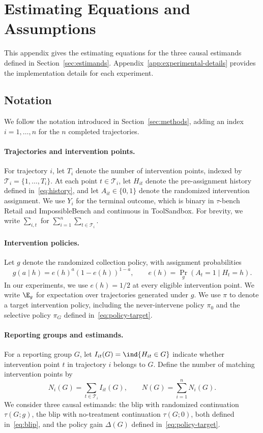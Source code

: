 \section{Estimating Equations and Assumptions}
\label{app:estimating-equations}

This appendix gives the estimating equations for the three causal estimands defined in Section~\ref{sec:estimands}. Appendix~\ref{app:experimental-details} provides the implementation details for each experiment.

\subsection{Notation}

We follow the notation introduced in Section~\ref{sec:methods}, adding an index $i=1,\ldots,n$ for the $n$ completed trajectories.

\paragraph{Trajectories and intervention points.}
For trajectory $i$, let $T_i$ denote the number of intervention points, indexed by $\mathcal T_i=\{1,\ldots,T_i\}$.
At each point $t\in\mathcal T_i$, let $H_{it}$ denote the pre-assignment history defined in~\eqref{eq:history}, and let $A_{it}\in\{0,1\}$ denote the randomized intervention assignment.
We use $Y_i$ for the terminal outcome, which is binary in $\tau$-bench Retail and ImpossibleBench and continuous in ToolSandbox.
For brevity, we write $\sum_{i,t}$ for $\sum_{i=1}^n\sum_{t\in\mathcal T_i}$.

\paragraph{Intervention policies.}
Let $g$ denote the randomized collection policy, with assignment probabilities
\[
g(a\mid h)=e(h)^a(1-e(h))^{1-a},
\qquad
e(h)=\Pr_g(A_t=1\mid H_t=h).
\]
In our experiments, we use $e(h)=1/2$ at every eligible intervention point.
We write $\E_g$ for expectation over trajectories generated under $g$.
We use $\pi$ to denote a target intervention policy, including the never-intervene policy $\pi_0$ and the selective policy $\pi_G$ defined in~\eqref{eq:policy-target}.

\paragraph{Reporting groups and estimands.}
For a reporting group $G$, let $I_{it}(G)=\ind\{H_{it}\in G\}$ indicate whether intervention point $t$ in trajectory $i$ belongs to $G$.
Define the number of matching intervention points by
\[
N_i(G)=\sum_{t\in\mathcal T_i}I_{it}(G),
\qquad
N(G)=\sum_{i=1}^n N_i(G).
\]
We consider three causal estimands: the blip with randomized continuation $\tau(G;g)$, the blip with no-treatment continuation $\tau(G;0)$, both defined in~\eqref{eq:blip}, and the policy gain $\Delta(G)$ defined in~\eqref{eq:policy-target}.

